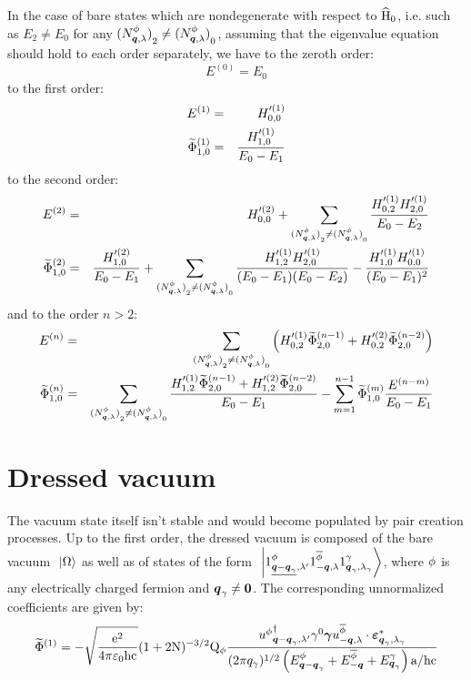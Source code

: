 \documentclass[10pt,a4paper,twoside,openany]{book}
\begin{document}
In the case of bare states which are nondegenerate with respect to $\widehat{\mathrm H}_0$, i.e. such as $E_2 \neq E_0$ for any ${({N}^{\phi}_{{\boldsymbol{q}}, {\lambda}})}_2 \neq {({N}^{\phi}_{{\boldsymbol{q}}, {\lambda}})}_0$, assuming that the eigenvalue equation should hold to each order separately, we have to the zeroth order:
\begin{equation*}
E^{(0)} = E_0
\end{equation*}
to the first order:
\begin{eqnarray*}
E^{(1)} & = & H'^{(1)}_{0,0} \\
\widetilde{\Phi}_{1,0}^{(1)} & = & \frac{H'^{(1)}_{1,0}}{E_0 - E_1}
\end{eqnarray*}
to the second order:
\begin{eqnarray*}
E^{(2)} & = & H'^{(2)}_{0,0} + \sum_{{({N}^{\phi}_{{\boldsymbol{q}}, {\lambda}})}_2 \neq {({N}^{\phi}_{{\boldsymbol{q}}, {\lambda}})}_0} \frac{H'^{(1)}_{0,2} H'^{(1)}_{2,0}}{E_0 - E_2} \\
\widetilde{\Phi}_{1,0}^{(2)} & = & \frac{H'^{(2)}_{1,0}}{E_0 - E_1} + \sum_{{({N}^{\phi}_{{\boldsymbol{q}}, {\lambda}})}_2 \neq {({N}^{\phi}_{{\boldsymbol{q}}, {\lambda}})}_0} \frac{H'^{(1)}_{1,2} H'^{(1)}_{2,0}}{( E_0 - E_1 ) ( E_0 - E_2 )} - \frac{H'^{(1)}_{1,0} H'^{(1)}_{0,0}}{( E_0 - E_1 )^2}
\end{eqnarray*}
and to the order $n > 2$:
\begin{eqnarray*}
E^{(n)} & = & \sum_{{({N}^{\phi}_{{\boldsymbol{q}}, {\lambda}})}_2 \neq {({N}^{\phi}_{{\boldsymbol{q}}, {\lambda}})}_0} \left( H'^{(1)}_{0,2} \widetilde{\Phi}_{2,0}^{(n - 1)} + H'^{(2)}_{0,2} \widetilde{\Phi}_{2,0}^{(n - 2)} \right) \\
\widetilde{\Phi}_{1,0}^{(n)} & = & \sum_{{({N}^{\phi}_{{\boldsymbol{q}}, {\lambda}})}_2 \neq {({N}^{\phi}_{{\boldsymbol{q}}, {\lambda}})}_0} \frac{H'^{(1)}_{1,2} \widetilde{\Phi}_{2,0}^{(n - 1)} + H'^{(2)}_{1,2} \widetilde{\Phi}_{2,0}^{(n - 2)}}{E_0 - E_1} - \sum_{m = 1}^{n - 1} \widetilde{\Phi}_{1,0}^{(m)} \frac{E^{(n - m)}}{E_0 - E_1}
\end{eqnarray*}


\section{Dressed vacuum}

The vacuum state itself isn't stable and would become populated by pair creation processes. Up to the first order, the dressed vacuum is composed of the bare vacuum $\ \left|{\Omega}\right\rangle$ as well as of states of the form $\ \left|{{1}^{\phi}_{{\underline{\boldsymbol{q}-\boldsymbol{q}_\gamma}}, {\lambda'}} {1}^{\overline{\phi}}_{{-\boldsymbol{q}}, {\lambda}} {1}^{\gamma}_{{\boldsymbol{q}_\gamma}, {\lambda_\gamma}}}\right\rangle$, where $\phi$ is any electrically charged fermion and $\boldsymbol{q}_\gamma \neq \boldsymbol{0}$. The corresponding unnormalized coefficients  are given by:
\begin{equation*}
\widetilde{\Phi}^{(1)} = - \sqrt{\frac{\mathrm e^2}{4 \pi \mathrm \varepsilon_0 \mathrm h \mathrm c}} ( 1 + 2 \mathrm N )^{-3/2} \mathrm Q_{\phi} \frac{{u^{\phi}}^{\dagger}_{{\boldsymbol{q} - \boldsymbol{q}_\gamma}, {\lambda'}} \gamma^{0} \boldsymbol{\gamma} u^{\overline{\phi}}_{{-\boldsymbol{q}}, {\lambda}} \cdot \boldsymbol{\varepsilon}_{{\boldsymbol{q}_\gamma},{\lambda_\gamma}}^*}{( 2 \pi q_\gamma )^{1 / 2} \left( E^{\phi}_{\boldsymbol{q} - \boldsymbol{q}_\gamma} + E^{\overline{\phi}}_{-\boldsymbol{q}} + E^{\gamma}_{\boldsymbol{q}_\gamma} \right) \mathrm a / \mathrm h \mathrm c}
\end{equation*}
\end{document}

